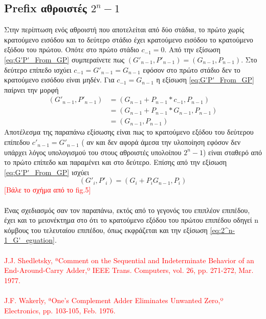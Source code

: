 \subsection{Prefix αθροιστές $2^n-1$ }
Στην περίπτωση ενός αθροιστή που αποτελείται από δύο στάδια, το πρώτο χωρίς κρατούμενο εισόδου
και το δεύτερο στάδιο έχει κρατούμενο εισόδου το κρατούμενο εξόδου του πρώτου. Οπότε στο
πρώτο στάδιο $c_{-1} = 0$. Από την εξίσωση \ref{eq:G'P'_From_GP} συμπεραίνετε πως 
$(G'_{n-1},P'_{n-1}) = (G_{n-1},P_{n-1})$. Στο δεύτερο επίπεδο ισχύει 
$c_{-1} = G'_{n-1} = G_{n-1} $ εφόσον στο πρώτο στάδιο δεν το κρατούμενο εισόδου είναι μηδέν.
Για $c_{-1} = G_{n-1}$ η εξίσωση \ref{eq:G'P'_From_GP} παίρνει την μορφή 
\begin{equation*}
\begin{split}
    (G'_{n-1},P'_{n-1}) &= ( G_{n-1} + P_{n-1}*c_{-1} ,  P_{n-1} )\\
    &=( G_{n-1} + P_{n-1}*G_{n-1} ,  P_{n-1} )\\
    &=(G_{n-1},P_{n-1})
\end{split}    
\end{equation*}
Αποτέλεσμα της παραπάνω εξίσωσης είναι πως το κρατούμενο εξόδου του δεύτερου επίπεδου 
$c'_{n-1} = G'_{n-1}$
( αν και δεν αφορά άμεσα την υλοποίηση εφόσον δεν υπάρχει λόγος υπολογισμού του 
στους αθροιστές υπολοίπου $2^n-1$) είναι σταθερό από το πρώτο επίπεδο και παραμένει και στο 
δεύτερο. Επίσης από την εξίσωση \ref{eq:G'P'_From_GP} ισχύει 
\begin{equation}
\label{eq:2^n-1_G'_eguation}
    (G'_i,P'_i) = (G_i + P_iG_{n-1} , P_{i})
\end{equation}
\textcolor{red}{[Βάλε το σχήμα από το \cite{vergos} fig.5]}
\\\\
Ένας σχεδιασμός σαν τον παραπάνω, εκτός από το γεγονός του επιπλέον επιπέδου,
έχει και το μειονέκτημα στο ότι το κρατούμενο εξόδου του πρώτου επιπέδου οδηγεί 
n κόμβους του τελευταίου επιπέδου, όπως εκφράζεται και την εξίσωση \ref{eq:2^n-1_G'_eguation}.
\\\\
\textcolor{red}{
J.J. Shedletsky, ªComment on the Sequential and Indeterminate
Behavior of an End-Around-Carry Adder,º IEEE Trans. Computers,
vol. 26, pp. 271-272, Mar. 1977.
\\\\
J.F. Wakerly, ªOne's Complement Adder Eliminates Unwanted
Zero,º Electronics, pp. 103-105, Feb. 1976.
}
















